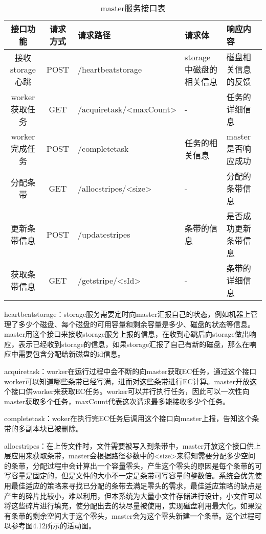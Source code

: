 \begin{table}[h]
  \centering
  \vspace{10pt}
  \caption{master服务接口表}
  \vspace{-15pt}
  \begin{tabular}{ccp{2.5cm}p{2cm}p{3cm}}
    \toprule
    接口功能   & 请求方式    & 请求路径     & 请求体    & 响应内容                     \\
    \midrule
    接收storage心跳       & POST  & /heartbeatstorage                & storage中磁盘的相关信息   & 磁盘相关信息的反馈\\
    worker获取任务        & GET   & /acquiretask\newline/<maxCount>  & -                        & 任务的详细信息\\
    worker完成任务        & POST  & /completetask                    & 任务的相关信息            & master是否响应成功\\
    分配条带              & GET   & /allocstripes\newline/<size>     & -                        & 分配的条带信息\\
    更新条带信息          & POST  & /updatestripes                   & 条带的信息                & 是否成功更新条带信息\\
    获取条带信息          & GET   & /getstripe\newline/<sId>    & -                        & 条带的详细信息\\
    \bottomrule
  \end{tabular}
\end{table}	

heartbeatstorage：storage服务需要定时向master汇报自己的状态，例如机器上管理了多少个磁盘、每个磁盘的可用容量和剩余容量是多少、磁盘的状态等信息。master用这个接口来接收storage服务上报的信息，在收到心跳后向storage做出响应，表示已经收到storage的信息，如果storage汇报了自己有新的磁盘，那么在响应中需要包含分配给新磁盘的id信息。

acquiretask：worker在运行过程中会不断的向master获取EC任务，通过这个接口worker可以知道哪些条带已经写满，进而对这些条带进行EC计算。master开放这个接口供worker来获取EC任务。worker可以并行执行任务，因此可以一次性向master获取多个任务，maxCount代表这次请求最多能接收多少个任务。

completetask：woker在执行完EC任务后调用这个接口向master上报，告知这个条带的多副本块已被删除。

allocstripes：在上传文件时，文件需要被写入到条带中，master开放这个接口供上层应用来获取条带，master会根据路径参数中的<size>来得知需要分配多少空间的条带，分配过程中会计算出一个容量零头，产生这个零头的原因是每个条带的可写容量是固定的，但是文件的大小不一定是条带可写容量的整数倍。系统会优先使用最佳适应的策略来寻找已分配的条带去满足零头的需求，最佳适应策略的缺点是产生的碎片比较小，难以利用，但本系统为大量小文件存储进行设计，小文件可以将这些碎片进行填充，使分配出去的块尽量被使用，实现磁盘利用最大化。如果没有条带的剩余空间大于这个零头，master会为这个零头新建一个条带。这个过程可以参考图4.12所示的活动图。

